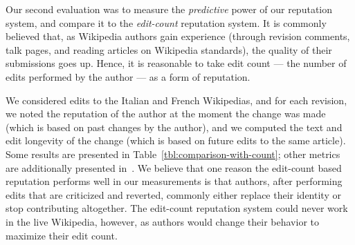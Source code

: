 Our second evaluation was to measure the \textit{predictive}
power of our reputation system, and compare it to the
\textit{edit-count} reputation system.
It is commonly believed that, as Wikipedia authors gain
experience (through revision comments, talk pages,
and reading articles on Wikipedia standards), the quality
of their submissions goes up.
Hence, it is reasonable to take edit count --- the number of edits
performed by the author --- as a form of reputation.

We considered edits to the Italian and French Wikipedias, and
for each revision, we noted the reputation of the author at the
moment the change was made (which is based on past changes by the author),
and we computed the text and edit longevity of the change (which
is based on future edits to the same article).
Some results are presented in Table~\ref{tbl:comparison-with-count};
other metrics are additionally presented in~\cite{www07}.
We believe that one reason the edit-count based reputation
performs well in our measurements is that authors, after
performing edits that are criticized and reverted,
commonly either replace their identity or stop contributing altogether.
The edit-count reputation system could never work in the live Wikipedia, however,
as authors would change their behavior to maximize their edit count.

